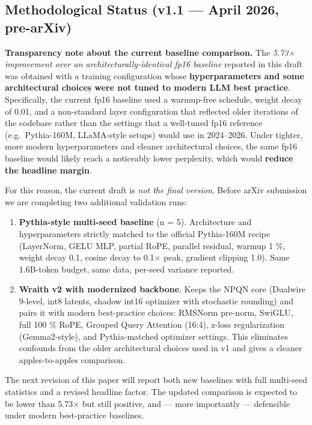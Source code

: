 \subsection{Methodological Status (v1.1 --- April 2026,
pre-arXiv)}\label{methodological-status-v1.1-april-2026-pre-arxiv}

\textbf{Transparency note about the current baseline comparison.} The
\emph{5.73× improvement over an architecturally-identical fp16 baseline}
reported in this draft was obtained with a training configuration whose
\textbf{hyperparameters and some architectural choices were not tuned to
modern LLM best practice}. Specifically, the current fp16 baseline used
a warmup-free schedule, weight decay of 0.01, and a non-standard layer
configuration that reflected older iterations of the codebase rather
than the settings that a well-tuned fp16 reference (e.g.~Pythia-160M,
LLaMA-style setups) would use in 2024--2026. Under tighter, more modern
hyperparameters and cleaner architectural choices, the same fp16
baseline would likely reach a noticeably lower perplexity, which would
\textbf{reduce the headline margin}.

For this reason, the current draft is \emph{not the final version}.
Before arXiv submission we are completing two additional validation
runs:

\begin{enumerate}
\def\labelenumi{\arabic{enumi}.}
\item
  \textbf{Pythia-style multi-seed baseline} (n = 5). Architecture and
  hyperparameters strictly matched to the official Pythia-160M recipe
  (LayerNorm, GELU MLP, partial RoPE, parallel residual, warmup 1 \%,
  weight decay 0.1, cosine decay to 0.1× peak, gradient clipping 1.0).
  Same 1.6B-token budget, same data, per-seed variance reported.
\item
  \textbf{Wraith v2 with modernized backbone}. Keeps the NPQN core
  (Dualwire 9-level, int8 latents, shadow int16 optimizer with
  stochastic rounding) and pairs it with modern best-practice choices:
  RMSNorm pre-norm, SwiGLU, full 100 \% RoPE, Grouped Query Attention
  (16:4), z-loss regularization (Gemma2-style), and Pythia-matched
  optimizer settings. This eliminates confounds from the older
  architectural choices used in v1 and gives a cleaner apples-to-apples
  comparison.
\end{enumerate}

The next revision of this paper will report both new baselines with full
multi-seed statistics and a revised headline factor. The updated
comparison is expected to be lower than 5.73× but still positive, and
--- more importantly --- defensible under modern best-practice
baselines.

